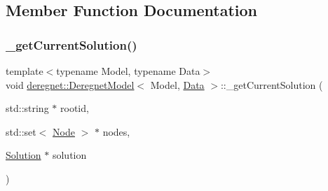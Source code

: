 \subsection{Member Function Documentation}
\mbox{\label{classderegnet_1_1DeregnetModel_a8b4f6be55c874c039c8180c1288f0319}} 
\subsubsection{\texorpdfstring{\+\_\+get\+Current\+Solution()}{\_getCurrentSolution()}\hspace{0.1cm}{\footnotesize\ttfamily [1/3]}}
{\footnotesize\ttfamily template$<$typename Model, typename Data$>$ \\
void \hyperlink{classderegnet_1_1DeregnetModel}{deregnet\+::\+Deregnet\+Model}$<$ Model, \hyperlink{avgdrgnt_8cpp_a1d1235306db276e9b36acba1db1509e8}{Data} $>$\+::\+\_\+get\+Current\+Solution (\begin{DoxyParamCaption}\item[{std\+::string $\ast$}]{rootid,  }\item[{std\+::set$<$ \hyperlink{namespacederegnet_a744bad34f2de9856d36715a445f027f3}{Node} $>$ $\ast$}]{nodes,  }\item[{\hyperlink{structderegnet_1_1Solution}{Solution} $\ast$}]{solution }\end{DoxyParamCaption})\hspace{0.3cm}{\ttfamily [private]}}

\mbox{\label{classderegnet_1_1DeregnetModel_ae031344d7bef7965ecbff1af301cc32b}} 
